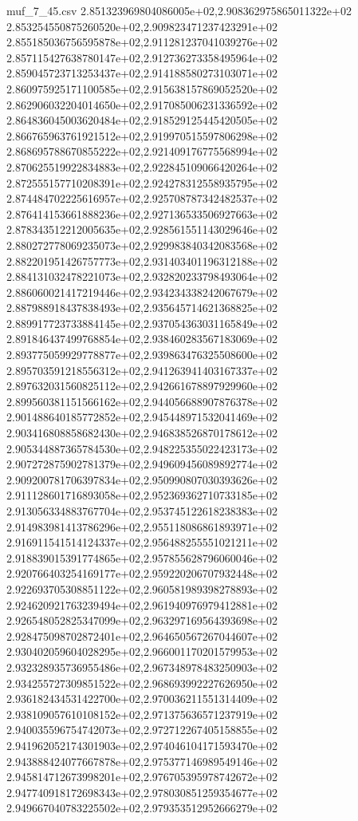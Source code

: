 \begin{filecontents*}{muf_7_45.csv}
2.851323969804086005e+02,2.908362975865011322e+02
2.853254550875260520e+02,2.909823471237423291e+02
2.855185036756595878e+02,2.911281237041039276e+02
2.857115427638780147e+02,2.912736273358495964e+02
2.859045723713253437e+02,2.914188580273103071e+02
2.860975925171100585e+02,2.915638157869052520e+02
2.862906032204014650e+02,2.917085006231336592e+02
2.864836045003620484e+02,2.918529125445420505e+02
2.866765963761921512e+02,2.919970515597806298e+02
2.868695788670855222e+02,2.921409176775568994e+02
2.870625519922834883e+02,2.922845109066420264e+02
2.872555157710208391e+02,2.924278312558935795e+02
2.874484702225616957e+02,2.925708787342482537e+02
2.876414153661888236e+02,2.927136533506927663e+02
2.878343512212005635e+02,2.928561551143029646e+02
2.880272778069235073e+02,2.929983840342083568e+02
2.882201951426757773e+02,2.931403401196312188e+02
2.884131032478221073e+02,2.932820233798493064e+02
2.886060021417219446e+02,2.934234338242067679e+02
2.887988918437838493e+02,2.935645714621368825e+02
2.889917723733884145e+02,2.937054363031165849e+02
2.891846437499768854e+02,2.938460283567183069e+02
2.893775059929778877e+02,2.939863476325508600e+02
2.895703591218556312e+02,2.941263941403167337e+02
2.897632031560825112e+02,2.942661678897929960e+02
2.899560381151566162e+02,2.944056688907876378e+02
2.901488640185772852e+02,2.945448971532041469e+02
2.903416808858682430e+02,2.946838526870178612e+02
2.905344887365784530e+02,2.948225355022423173e+02
2.907272875902781379e+02,2.949609456089892774e+02
2.909200781706397834e+02,2.950990807030393626e+02
2.911128601716893058e+02,2.952369362710733185e+02
2.913056334883767704e+02,2.953745122618238383e+02
2.914983981413786296e+02,2.955118086861893971e+02
2.916911541514124337e+02,2.956488255551021211e+02
2.918839015391774865e+02,2.957855628796060046e+02
2.920766403254169177e+02,2.959220206707932448e+02
2.922693705308851122e+02,2.960581989398278893e+02
2.924620921763239494e+02,2.961940976979412881e+02
2.926548052825347099e+02,2.963297169564393698e+02
2.928475098702872401e+02,2.964650567267044607e+02
2.930402059604028295e+02,2.966001170201579953e+02
2.932328935736955486e+02,2.967348978483250903e+02
2.934255727309851522e+02,2.968693992227626950e+02
2.936182434531422700e+02,2.970036211551314409e+02
2.938109057610108152e+02,2.971375636571237919e+02
2.940035596754742073e+02,2.972712267405158855e+02
2.941962052174301903e+02,2.974046104171593470e+02
2.943888424077667878e+02,2.975377146989549146e+02
2.945814712673998201e+02,2.976705395978742672e+02
2.947740918172698343e+02,2.978030851259354677e+02
2.949667040783225502e+02,2.979353512952666279e+02

\end{filecontents*}
